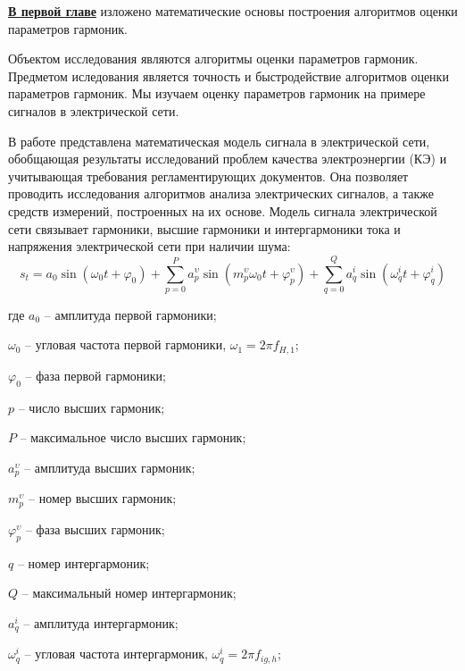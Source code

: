 \underline{\textbf{В первой главе}} изложено %
математические основы построения алгоритмов оценки параметров гармоник.

Объектом исследования являются алгоритмы оценки параметров гармоник. Предметом иследования является точность и быстродействие алгоритмов оценки параметров гармоник. Мы изучаем оценку параметров гармоник на примере сигналов в электрической сети.

В работе представлена математическая модель сигнала в электрической сети, обобщающая результаты исследований проблем качества электроэнергии (КЭ) и учитывающая требования регламентирующих документов. Она позволяет проводить исследования алгоритмов анализа электрических сигналов, а также средств измерений, построенных на их основе.
Модель сигнала электрической сети связывает гармоники, высшие гармоники и интергармоники тока и напряжения электрической сети при наличии шума: 
\begin{equation}
	\label{eq:equation1}
	s_{t} = a_{0} \sin (\omega_{0} t + \varphi_{0}) + \displaystyle\sum_{p=0}^{P} a_p^{\upsilon} \sin (m_p^{\upsilon} \omega_{0} t + \varphi_p^{\upsilon}) + \displaystyle\sum_{q=0}^{Q} a_q^i \sin  (\omega_q^i t + \varphi_q^{i})
\end{equation}

где $a_{0}$ – амплитуда первой гармоники;

$\omega_{0}$ – угловая частота первой гармоники, $\omega_{1} = 2 \pi f_{H,1}$;

$\varphi_{0}$ – фаза первой гармоники; 

$p$ – число высших гармоник;

$P$ – максимальное число высших гармоник;

$a_p^{\upsilon}$ – амплитуда высших гармоник;

$m_p^{\upsilon}$ – номер высших гармоник;

$\varphi_p^{\upsilon}$ – фаза высших гармоник;

$q$ – номер интергармоник;

$Q$ – максимальный номер интергармоник;

$a_q^i$ – амплитуда интергармоник;

$\omega_q^i$ – угловая частота интергармоник, $\omega_q^i=2\pi f_{ig,h}$; 

